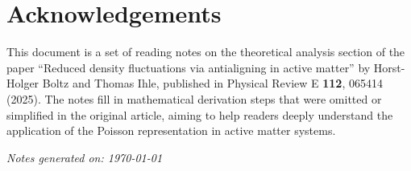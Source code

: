 
\section*{Acknowledgements}

This document is a set of reading notes on the theoretical analysis section of the paper ``Reduced density fluctuations via antialigning in active matter'' by Horst-Holger Boltz and Thomas Ihle, published in Physical Review E \textbf{112}, 065414 (2025). The notes fill in mathematical derivation steps that were omitted or simplified in the original article, aiming to help readers deeply understand the application of the Poisson representation in active matter systems.

\bigskip
\noindent\textit{Notes generated on: \today}
